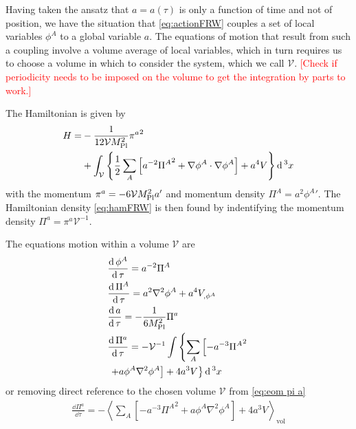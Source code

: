 Having taken the ansatz that $a=a(\tau)$ is only a function of time and not of position, we have the situation that \eqref{eq:actionFRW} couples a set of local variables $\phi^A$ to a global variable $a$. The equations of motion that result from such a coupling involve a volume average of local variables, which in turn requires us to choose a volume in which to consider the system, which we call $\mathcal{V}$. 
\textcolor{red}{[Check if periodicity needs to be imposed on the volume to get the integration by parts to work.]}

The Hamiltonian is given by
\begin{align} \label{eq:hamFRW finite volume}
  \begin{split}
  H = & - \frac{1}{12\mathcal{V}M_{\mathrm{Pl}}^2}{\pi^a}^2 \\
    & + \int_\mathcal{V} \left\{ \frac{1}{2}\sum_A\left[a^{-2}{\Pi^A}^2 + \nabla\phi^A\cdot\nabla\phi^A\right]
    + a^4V
    \right\}\mathrm{d}\,^3x
  \end{split}
\end{align}
with the momentum $\pi^a = -6\mathcal{V}M_{\mathrm{Pl}}^2a'$ and momentum density $\Pi^A = a^2{\phi^A}'$. The Hamiltonian density \eqref{eq:hamFRW} is then found by indentifying the momentum density $\Pi^a=\pi^a\mathcal{V}^{-1}$.

The equations motion within a volume $\mathcal{V}$ are
\begin{align}
  & \frac{\mathrm{d}\,\phi^A}{\mathrm{d}\,\tau} = a^{-2}\Pi^A \label{eq:eom phi} \\
  & \frac{\mathrm{d}\,\Pi^A}{\mathrm{d}\,\tau} = a^2\nabla^2\phi^A + a^4V_{,\phi^A} \\
  & \frac{\mathrm{d}\, a}{\mathrm{d}\,\tau} = -\frac{1}{6M_{\mathrm{Pl}}^2}\Pi^a \\
  & \frac{\mathrm{d}\,\Pi^a}{\mathrm{d}\,\tau} = -\mathcal{V}^{-1}\int\left\{
  \sum_A\left[-a^{-3}{\Pi^A}^2 \right. \right. \\
    & \left. \left. + a\phi^A\nabla^2\phi^A \right] +4a^3V
  \right\}\mathrm{d}\,^3x \label{eq:eom pi a}
\end{align}
or removing direct reference to the chosen volume $\mathcal{V}$ from \eqref{eq:eom pi a}
\begin{align}
  \frac{\dd\Pi^a}{\dd\tau} = -\left\langle
  \sum_A\left[-a^{-3}{\Pi^A}^2 + a\phi^A\nabla^2\phi^A \right] +4a^3V
  \right\rangle_\mathrm{vol}
\end{align}

